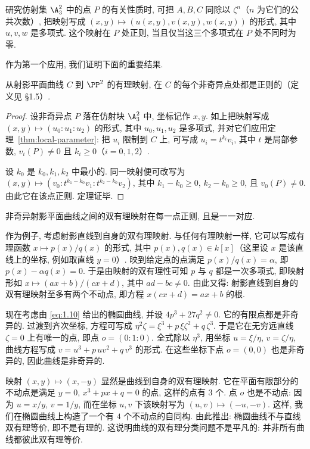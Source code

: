 研究仿射集 $\A^2_3$ 中的点 $P$ 的有关性质时, 可把 $A, B, C$ 同除以 $\zeta^n$（$n$ 为它们的公共次数）, 把映射写成 $(x, y) \mapsto (u(x,y), v(x,y), w(x,y))$ 的形式, 其中 $u, v, w$ 是多项式. 这个映射在 $P$ 处正则, 当且仅当这三个多项式在 $P$ 处不同时为零.

作为第一个应用, 我们证明下面的重要结果.

\begin{theorem}\label{thm:rational-map-regular}
	从射影平面曲线 $C$ 到 $\PP^2$ 的有理映射, 在 $C$ 的每个非奇异点处都是正则的（定义见 §1.5）.
\end{theorem}

\begin{proof}
	设非奇异点 $P$ 落在仿射块 $\A^2_3$ 中, 坐标记作 $x, y$. 如上把映射写成 $(x, y) \mapsto (u_0 : u_1 : u_2)$ 的形式, 其中 $u_0, u_1, u_2$ 是多项式, 并对它们应用定理~\ref{thm:local-parameter}: 把 $u_i$ 限制到 $C$ 上, 可写成 $u_i = t^{k_i} v_i$, 其中 $t$ 是局部参数, $v_i(P) \ne 0$ 且 $k_i \ge 0$（$i = 0, 1, 2$）.

	设 $k_0$ 是 $k_0, k_1, k_2$ 中最小的. 同一映射便可改写为 $(x,y) \mapsto (v_0 : t^{k_1 - k_0} v_1 : t^{k_2 - k_0} v_2)$, 其中 $k_1 - k_0 \ge 0$, $k_2 - k_0 \ge 0$, 且 $v_0(P) \ne 0$. 由此它在该点正则. 定理证毕.
\end{proof}

\begin{corollary}\label{cor:birational-regular}
	非奇异射影平面曲线之间的双有理映射在每一点正则, 且是一一对应.
\end{corollary}

作为例子, 考虑射影直线到自身的双有理映射. 与任何有理映射一样, 它可以写成有理函数 $x \mapsto p(x)/q(x)$ 的形式, 其中 $p(x), q(x) \in k[x]$（这里设 $x$ 是该直线上的坐标, 例如取直线 $y = 0$）. 映到给定点的点满足 $p(x)/q(x) = \alpha$, 即 $p(x) - \alpha q(x) = 0$. 于是由映射的双有理性可知 $p$ 与 $q$ 都是一次多项式, 即映射形如 $x \mapsto (ax+b)/(cx+d)$, 其中 $ad - bc \ne 0$. 由此又得: 射影直线到自身的双有理映射至多有两个不动点, 即方程 $x(cx+d) = ax+b$ 的根.

现在考虑由 \eqref{eq:1.10} 给出的椭圆曲线, 并设 $4p^3 + 27q^2 \ne 0$. 它的有限点都是非奇异的. 过渡到齐次坐标, 方程可写成 $\eta^2 \zeta = \xi^3 + p\,\xi\zeta^2 + q\,\zeta^3$. 于是它在无穷远直线 $\zeta = 0$ 上有唯一的点, 即点 $o = (0 : 1 : 0)$. 全式除以 $\eta^3$, 用坐标 $u = \xi/\eta$, $v = \zeta/\eta$, 曲线方程写成 $v = u^3 + p\,u v^2 + q\, v^3$ 的形式. 在这些坐标下点 $o = (0,0)$ 也是非奇异的, 因此曲线是非奇异的.

映射 $(x, y) \mapsto (x, -y)$ 显然是曲线到自身的双有理映射. 它在平面有限部分的不动点是满足 $y = 0$, $x^3 + px + q = 0$ 的点, 这样的点有 $3$ 个. 点 $o$ 也是不动点: 因为 $u = x/y$, $v = 1/y$, 而在坐标 $u, v$ 下该映射写为 $(u, v) \mapsto (-u, -v)$. 这样, 我们在椭圆曲线上构造了一个有 $4$ 个不动点的自同构. 由此推出: 椭圆曲线不与直线双有理等价, 即不是有理的. 这说明曲线的双有理分类问题不是平凡的: 并非所有曲线都彼此双有理等价.

